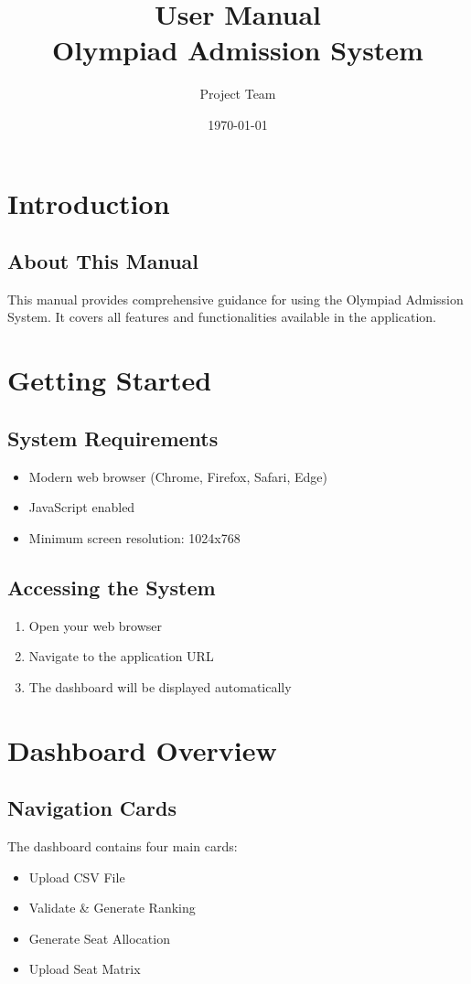 \documentclass[12pt,a4paper]{article}
\title{User Manual\\
       Olympiad Admission System}
\author{Project Team}
\date{\today}
\begin{document}
\maketitle
\tableofcontents
\newpage

\section{Introduction}
\subsection{About This Manual}
This manual provides comprehensive guidance for using the Olympiad Admission System. It covers all features and functionalities available in the application.

\section{Getting Started}
\subsection{System Requirements}
\begin{itemize}
    \item Modern web browser (Chrome, Firefox, Safari, Edge)
    \item JavaScript enabled
    \item Minimum screen resolution: 1024x768
\end{itemize}

\subsection{Accessing the System}
\begin{enumerate}
    \item Open your web browser
    \item Navigate to the application URL
    \item The dashboard will be displayed automatically
\end{enumerate}

\section{Dashboard Overview}
\subsection{Navigation Cards}
The dashboard contains four main cards:
\begin{itemize}
    \item Upload CSV File
    \item Validate \& Generate Ranking
    \item Generate Seat Allocation
    \item Upload Seat Matrix
\end{itemize}
\end{document}
